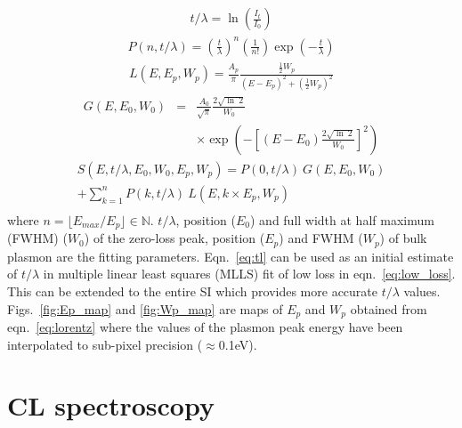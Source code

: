 \documentclass[%
 aip,
rsi,%
 amsmath,amssymb,
 reprint,%
]{revtex4-1}
\begin{document}
\begin{eqnarray}
	t/\lambda = \operatorname{ln}\left(\frac{I_t}{I_0}\right)
    \label{eq:tl}
\end{eqnarray}
\begin{eqnarray}
	P(n,t/\lambda) = \left(\frac{t}{\lambda}\right)^n\left(\frac{1}{n!}\right)\operatorname{exp}\left(-\frac{t}{\lambda}\right)
    \label{eq:poisson}
\end{eqnarray}
\begin{eqnarray}
	L(E,E_p,W_p) = \frac{A_p}{\pi} \frac{\frac{1}{2}W_p}{(E-E_p)^2+\left(\frac{1}{2}W_p\right)^2}
    \label{eq:lorentz}
\end{eqnarray}
\begin{eqnarray}
	G(E,E_0,W_0) &=& \frac{A_0}{\sqrt{\pi}}\frac{2\sqrt{\operatorname{ln}~2}}{W_0}\nonumber\\
    & & \times \operatorname{exp}\left(-\left[(E-E_0)\frac{2\sqrt{\operatorname{ln}~2}}{W_0}\right]^2\right)
    \label{eq:gauss}
\end{eqnarray}
\begin{eqnarray}
	S(E,t/\lambda,E_0,W_0,E_p,W_p) = P(0,t/\lambda)~G(E,E_0,W_0) \nonumber \\
     +\sum_{k=1}^{n}P(k,t/\lambda)~L(E,k\times E_p,W_p) \nonumber \\
    \label{eq:low_loss}
\end{eqnarray}
where $n = \lfloor E_{max}/E_p \rfloor \in \mathbb{N}$.  $t/\lambda$, position ($E_0$) and full width at half maximum (FWHM) ($W_0$) of the zero-loss peak, position ($E_p$) and FWHM ($W_p$) of bulk plasmon are the fitting parameters. Eqn.~\ref{eq:tl} can be used as an initial estimate of $t/\lambda$ in multiple linear least squares (MLLS) fit of low loss in eqn.~\ref{eq:low_loss}. This can be extended to the entire SI which provides more accurate $t/\lambda$ values. Figs.~\ref{fig:Ep_map} and \ref{fig:Wp_map} are maps of $E_p$ and $W_p$ obtained from eqn.~\ref{eq:lorentz} where the values of the plasmon peak energy have been interpolated to sub-pixel precision ($\approx$0.1eV).

\section{CL spectroscopy}
\label{sec:CLS}
\end{document}
